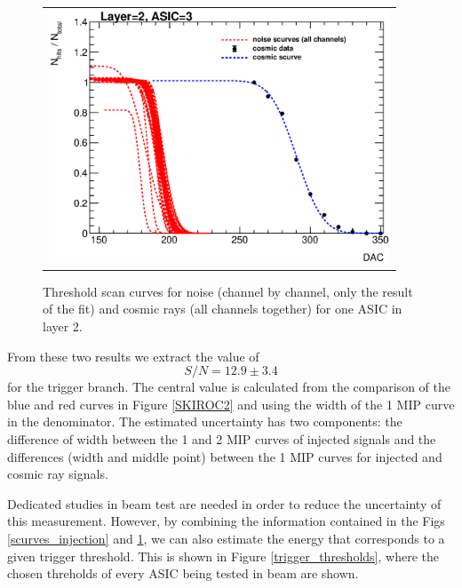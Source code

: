 \documentclass[a4paper,11pt]{article}
\begin{document}
\begin{figure}[!ht]
    \centering
  \begin{tabular}{l}
	\includegraphics[width=4in]{../figs/commissioning/cosmic_scurves_asic3_layer2.eps} 
	\end{tabular}
\caption{Threshold scan curves for noise (channel by channel, only the result of the fit) and cosmic rays (all channels together) for one ASIC in layer 2.}
\label{scurves_cosmics}
\end{figure}

From these two results we extract the value of
\begin{equation}
  S/N=12.9\pm3.4
\end{equation}
for the trigger branch. The central value is calculated from the comparison of the blue and red curves
in Figure \ref{SKIROC2} and using the width of the 1 MIP curve in the denominator. The estimated
uncertainty has two components: the difference of width between the 1 and 2 MIP curves of injected signals and the differences (width and middle point) between the 1 MIP curves for injected and
cosmic ray signals.

Dedicated studies in beam test are needed in order to
reduce the uncertainty of this measurement.
However, by combining the information contained in the Figs \ref{scurves_injection} and \ref{scurves_cosmics}, we can also estimate the energy that corresponds
to a given trigger threshold.
This is shown in Figure \ref{trigger_thresholds}, where the chosen threholds of every ASIC being tested
in beam are shown.
\end{document}
